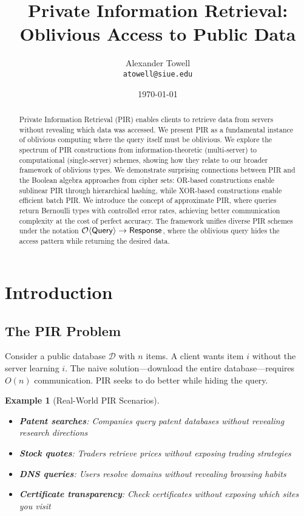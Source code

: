 \documentclass[11pt,final,hidelinks]{article}
\title{Private Information Retrieval: Oblivious Access to Public Data}
\author{
    Alexander Towell\\
    \texttt{atowell@siue.edu}
}
\date{\today}
\newcommand{\DB}{\mathcal{D}}
\newcommand{\Query}{\mathsf{Query}}
\newcommand{\Response}{\mathsf{Response}}
\newtheorem{example}[theorem]{Example}
\begin{document}
\maketitle

\begin{abstract}
Private Information Retrieval (PIR) enables clients to retrieve data from servers without revealing which data was accessed. We present PIR as a fundamental instance of oblivious computing where the query itself must be oblivious. We explore the spectrum of PIR constructions from information-theoretic (multi-server) to computational (single-server) schemes, showing how they relate to our broader framework of oblivious types. We demonstrate surprising connections between PIR and the Boolean algebra approaches from cipher sets: OR-based constructions enable sublinear PIR through hierarchical hashing, while XOR-based constructions enable efficient batch PIR. We introduce the concept of approximate PIR, where queries return Bernoulli types with controlled error rates, achieving better communication complexity at the cost of perfect accuracy. The framework unifies diverse PIR schemes under the notation $\Obv{\Query} \to \Response$, where the oblivious query hides the access pattern while returning the desired data.
\end{abstract}

\ObliviousNotationGuide

\section{Introduction}

\subsection{The PIR Problem}

Consider a public database $\DB$ with $n$ items. A client wants item $i$ without the server learning $i$. The naive solution—download the entire database—requires $O(n)$ communication. PIR seeks to do better while hiding the query.

\begin{example}[Real-World PIR Scenarios]
\begin{itemize}
    \item \textbf{Patent searches}: Companies query patent databases without revealing research directions
    \item \textbf{Stock quotes}: Traders retrieve prices without exposing trading strategies  
    \item \textbf{DNS queries}: Users resolve domains without revealing browsing habits
    \item \textbf{Certificate transparency}: Check certificates without exposing which sites you visit
\end{itemize}
\end{example}
\end{document}
